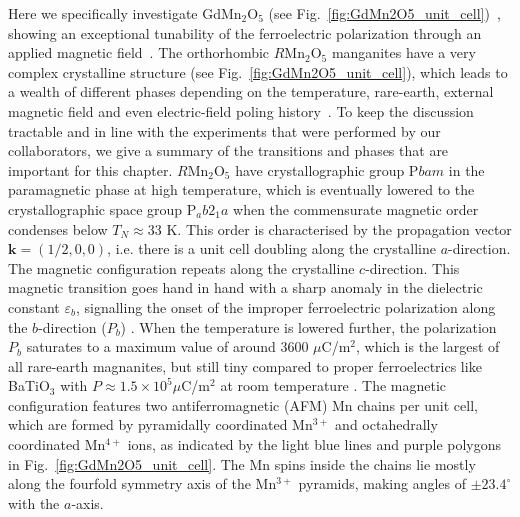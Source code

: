 Here we specifically investigate GdMn$_2$O$_5$ (see Fig.~\ref{fig:GdMn2O5_unit_cell})~\cite{Khomskii2009}, showing an exceptional tunability of the ferroelectric polarization through an applied magnetic field~\cite{Lee13}.
The orthorhombic $R$Mn$_2$O$_5$ manganites have a very complex crystalline structure (see Fig.~\ref{fig:GdMn2O5_unit_cell}), which leads to a wealth of different phases depending on the temperature, rare-earth, external magnetic field and even electric-field poling history~\cite{Zheng2019}.
To keep the discussion tractable and in line with the experiments that were performed by our collaborators, we give a summary of the transitions and phases that are important for this chapter.
$R$Mn$_2$O$_5$ have crystallographic group P$bam$ \cite{Alonso97} in the paramagnetic phase at high temperature, which is eventually lowered to the crystallographic space group P$_ab2_1a$ when the commensurate magnetic order condenses below $T_{N} \approx 33$ K.
This order is characterised by the propagation vector $\bm{k} = (1/2, 0, 0)$, i.e. there is a unit cell doubling along the crystalline $a$-direction.
The magnetic configuration repeats along the crystalline $c$-direction. This magnetic transition goes hand in hand with a sharp anomaly in the dielectric constant $\varepsilon_b$, signalling the onset of the improper ferroelectric polarization  along the $b$-direction ($P_b$) \cite{Lee13}.
When the temperature is lowered further, the polarization $P_b$ saturates to a maximum value of around 3600 $\mu$C/m$^2$, which is the largest of all rare-earth magnanites, but still tiny compared to proper ferroelectrics like BaTiO$_3$ with $P \approx 1.5 \times 10^5 \mu $C/m$^2$ at room temperature \cite{Mason1948,VonHippel1950}.
The magnetic configuration features two antiferromagnetic (AFM) Mn chains per unit cell, which are formed by pyramidally coordinated Mn$^{3+}$ and octahedrally coordinated Mn$^{4+}$ ions, as indicated by the light blue lines and purple polygons in Fig.~\ref{fig:GdMn2O5_unit_cell}. The Mn spins inside the chains lie mostly along the fourfold symmetry axis of the Mn$^{3+}$ pyramids, making angles of $\pm 23.4^\circ$ with the $a$-axis.

